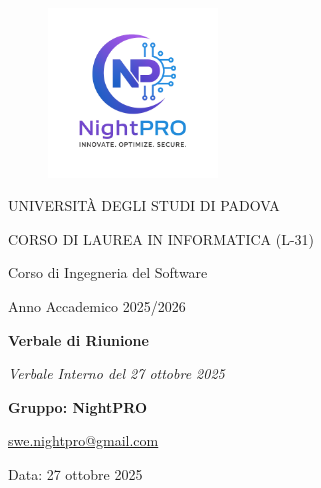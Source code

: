 \documentclass[a4paper, 11pt, oneside]{scrartcl} %
\begin{document}
\thispagestyle{empty}
\begin{titlepage}
    \centering
    
\begin{figure}
    \centering
    \includegraphics[width=0.4\textwidth]{logo.png}
\end{figure}

    \vfill
    
    {\small UNIVERSITÀ DEGLI STUDI DI PADOVA \par}
    {\small CORSO DI LAUREA IN INFORMATICA (L-31) \par}
    \vspace{0.5cm}
    {\large Corso di Ingegneria del Software \par}
    {\small Anno Accademico 2025/2026 \par}


    
    \vfill
    
    {\Huge \bfseries Verbale di Riunione \par}
    
    \vspace{1cm}
    
    {\Large \itshape Verbale Interno del 27 ottobre 2025 \par} 
    
    \vfill
    
    {\Large \bfseries Gruppo: NightPRO \par}
    \vspace{0.5cm}
    {\large \href{mailto:swe.nightpro@gmail.com}{swe.nightpro@gmail.com} \par}
    
    \vfill
  
    {\large Data: 27 ottobre 2025 \par}

\end{titlepage}
\end{document}
